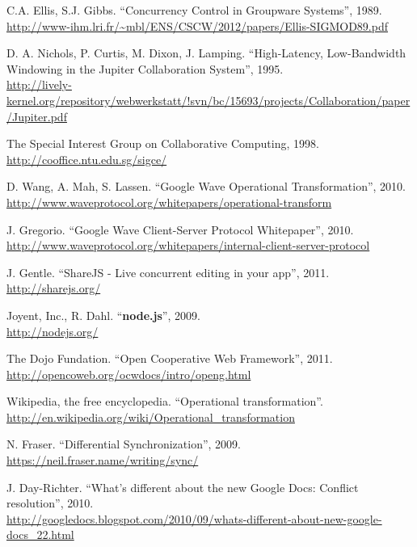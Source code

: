 \documentclass[a4paper, 12pt, twoside]{book}
\begin{document}
\begin{thebibliography}{99}

 C.A. Ellis, S.J. Gibbs. “Concurrency Control in Groupware Systems”, 1989.
\\\url{http://www-ihm.lri.fr/~mbl/ENS/CSCW/2012/papers/Ellis-SIGMOD89.pdf}

 D. A. Nichols, P. Curtis, M. Dixon, J. Lamping. “High-Latency, Low-Bandwidth Windowing in the Jupiter Collaboration System”, 1995.
\\\url{http://lively-kernel.org/repository/webwerkstatt/!svn/bc/15693/projects/Collaboration/paper/Jupiter.pdf}

 The Special Interest Group on Collaborative Computing, 1998.
\\\url{http://cooffice.ntu.edu.sg/sigce/}

 D. Wang, A. Mah, S. Lassen. “Google Wave Operational Transformation”, 2010.
\\\url{http://www.waveprotocol.org/whitepapers/operational-transform}

 J. Gregorio. “Google Wave Client-Server Protocol Whitepaper”, 2010.
\\\url{http://www.waveprotocol.org/whitepapers/internal-client-server-protocol}

 J. Gentle. “ShareJS - Live concurrent editing in your app”, 2011.
\\\url{http://sharejs.org/}

 Joyent, Inc., R. Dahl. “\textbf{node.js}”, 2009.
\\\url{http://nodejs.org/}

 The Dojo Fundation. “Open Cooperative Web Framework”, 2011.
\\\url{http://opencoweb.org/ocwdocs/intro/openg.html}

 Wikipedia, the free encyclopedia. “Operational transformation”.
\\\url{http://en.wikipedia.org/wiki/Operational_transformation}

 N. Fraser. “Differential Synchronization”, 2009.
\\\url{https://neil.fraser.name/writing/sync/}

 J. Day-Richter. “What’s different about the new Google Docs: Conflict resolution”, 2010.
\\\url{http://googledocs.blogspot.com/2010/09/whats-different-about-new-google-docs_22.html}


\end{thebibliography}
\end{document}
